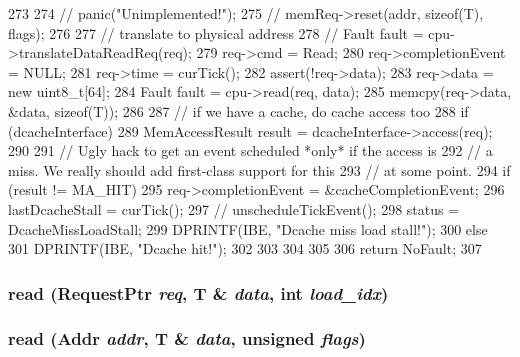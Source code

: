 \begin{DoxyCode}
273 {
274 //    panic("Unimplemented!");
275 //    memReq->reset(addr, sizeof(T), flags);
276 
277     // translate to physical address
278 //    Fault fault = cpu->translateDataReadReq(req);
279     req->cmd = Read;
280     req->completionEvent = NULL;
281     req->time = curTick();
282     assert(!req->data);
283     req->data = new uint8_t[64];
284     Fault fault = cpu->read(req, data);
285     memcpy(req->data, &data, sizeof(T));
286 
287     // if we have a cache, do cache access too
288     if (dcacheInterface) {
289         MemAccessResult result = dcacheInterface->access(req);
290 
291         // Ugly hack to get an event scheduled *only* if the access is
292         // a miss.  We really should add first-class support for this
293         // at some point.
294         if (result != MA_HIT) {
295             req->completionEvent = &cacheCompletionEvent;
296             lastDcacheStall = curTick();
297 //          unscheduleTickEvent();
298             status = DcacheMissLoadStall;
299             DPRINTF(IBE, "Dcache miss load stall!\n");
300         } else {
301             DPRINTF(IBE, "Dcache hit!\n");
302 
303         }
304     }
305 
306     return NoFault;
307 }
\end{DoxyCode}
\hypertarget{classInorderBackEnd_a0747777ac998dabdc20fa0c554d378d3}{
\subsubsection[{read}]{ read ({\bf RequestPtr} {\em req}, \/  T \& {\em data}, \/  int {\em load\_\-idx})}}
\label{classInorderBackEnd_a0747777ac998dabdc20fa0c554d378d3}
\hypertarget{classInorderBackEnd_a54c0093df1bc3e8cd4f00246884389cc}{
\subsubsection[{read}]{ read ({\bf Addr} {\em addr}, \/  T \& {\em data}, \/  unsigned {\em flags})}}
\label{classInorderBackEnd_a54c0093df1bc3e8cd4f00246884389cc}



